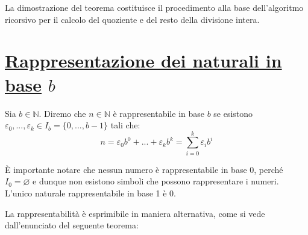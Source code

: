 \documentclass[oneside]{book}
\begin{document}
La dimostrazione del teorema costituisce il procedimento alla base
dell'algoritmo ricorsivo per il calcolo del quoziente e del resto
della divisione intera.
\begin{tcolorbox}[enhanced, breakable, colback=red!30, colframe=red!30!black, title=Algoritmo di divisione euclidea]

\end{tcolorbox}

\section{\underline{Rappresentazione dei naturali in base} $b$}
\begin{tcolorbox}[colback=yellow!30, colframe=yellow!30!black, title=Rappresentabilità dei naturali in base arbitraria]
Sia $b\in\mathbb{N}$. Diremo che $n\in\mathbb{N}$ è rappresentabile in base $b$ se
esistono $\varepsilon_0,...,\varepsilon_k\in I_b=\{0,...,b-1\}$ tali che:
\[ n=\varepsilon_0b^0+...+\varepsilon_k b^k = \sum_{i=0}^{k}\varepsilon_ib^i \]
\end{tcolorbox}

\begin{osservaz}
È importante notare che nessun numero è rappresentabile in base 0, perché
$I_0 = \varnothing$ e dunque non esistono simboli che possono rappresentare
i numeri. L'unico naturale rappresentabile in base 1 è 0.
\end{osservaz}

La rappresentabilità è esprimibile in maniera alternativa, come si vede dall'enunciato
del seguente teorema:
\end{document}
